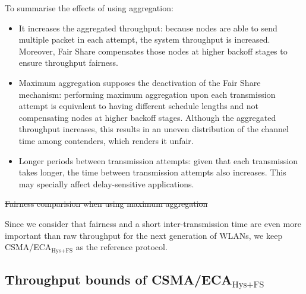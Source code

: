 \documentclass[a4paper,journal]{IEEEtran}
\providecommand{\DIFdeltex}[1]{{\protect\color{red}\sout{#1}}}                      %
\providecommand{\DIFdelbegin}{} %
\providecommand{\DIFdelend}{} %
\providecommand{\DIFdelFL}[1]{\DIFdel{#1}} %
\providecommand{\DIFdel}[1]{\texorpdfstring{\DIFdeltex{#1}}{}} %
\begin{document}
	To summarise the effects of using aggregation:
	\begin{itemize}
		\item It increases the aggregated throughput: because nodes are able to send multiple packet in each attempt, the system throughput is increased. Moreover, Fair Share compensates those nodes at higher backoff stages to ensure throughput fairness.
		\item Maximum aggregation supposes the deactivation of the Fair Share mechanism: performing maximum aggregation upon each transmission attempt is equivalent to having different schedule lengths and not compensating nodes at higher backoff stages. Although the aggregated throughput increases, this results in an uneven distribution of the channel time among contenders, which renders it unfair.
		\item Longer periods between transmission attempts: given that each transmission takes longer, the time between transmission attempts also increases. This may specially affect delay-sensitive applications.
	\end{itemize}

	\DIFdelbegin %
{%
\DIFdelFL{Fairness comparision when using maximum aggregation}}
\DIFdelend %

	Since we consider that fairness and a short inter-transmission time are even more important than raw throughput for the next generation of WLANs, we keep CSMA/ECA$_{\text{Hys+FS}}$ as the reference protocol.

	\subsection{Throughput bounds of CSMA/ECA$_{\text{Hys+FS}}$}\label{ECA-bounds}
\end{document}
